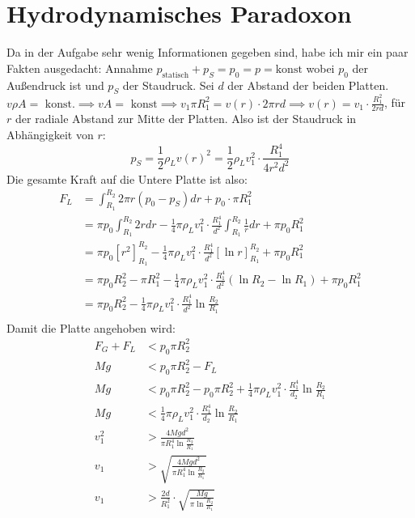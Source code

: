 \documentclass[sectionformat=aufgabe]{gadsescript}
\begin{document}
\section{Hydrodynamisches Paradoxon}
Da in der Aufgabe sehr wenig Informationen gegeben sind, habe ich mir ein paar Fakten ausgedacht: Annahme $ p_{\text{statisch}}  + p_S = p_0 = p = \text{konst} $ wobei $ p_0 $ der Außendruck ist und $ p_S $ der Staudruck. Sei $ d $ der Abstand der beiden Platten.\\
$ v\rho A = \text{ konst.} \implies vA = \text{ konst} \implies v_1  \pi R_1^2 = v(r) \cdot 2 \pi r d \implies v(r) = v_1 \cdot \frac{R_1^2}{ 2rd }  $, für $ r $ der radiale Abstand zur Mitte der Platten. Also ist der Staudruck in Abhängigkeit von $ r $:
\[
	p_S = \frac{ 1 }{ 2 } \rho_L v(r)^2 = \frac{ 1 }{ 2 } \rho_L v_1^2 \cdot \frac{ R_1^4 }{ 4r^2d^2 } 
\]
Die gesamte Kraft auf die Untere Platte ist also:
\begin{align*}
	F_L &=  \int_{R_1}^{R_2} 2 \pi  r (p_0 - p_S) dr + p_0 \cdot \pi R_1^2 \\
	    &= \pi p_0 \int_{R_1}^{R_2} 2r dr - \frac{ 1 }{ 4 } \pi \rho_L v_1^2 \cdot \frac{ R_1^4 }{ d^2 } \int_{R_1}^{R_2} \frac{ 1 }{ r } dr + \pi p_0 R_1^2 \\
	    &= \pi p_0 [r^2]_{R_1} ^{R_2} - \frac{ 1 }{ 4 } \pi \rho_L v_1^2 \cdot \frac{ R_1^4 }{ d^2 } [\ln r]_{R_1} ^{R_2}  + \pi p_0 R_1^2 \\
	    &= \pi p_0 R_2^2 - \pi R_1^2 - \frac{ 1 }{ 4 } \pi \rho_L v_1^2 \cdot \frac{ R_1^4 }{ d^2 } \left( \ln R_2 - \ln R_1 \right) + \pi p_0 R_1^2 \\
	    &= \pi p_0 R_2^2 - \frac{ 1 }{ 4 } \pi \rho_L v_1^2 \cdot \frac{ R_1^4 }{ d^2 } \ln \frac{R_2}{ R_1 } \\
\end{align*}
Damit die Platte angehoben wird:
\begin{align*}
	F_G + F_L &< p_0 \pi R_2^2 \\
	Mg &< p_0 \pi R_2^2 - F_L \\
	Mg &< p_0 \pi R_2^2 - p_0 \pi  R_2^2 + \frac{ 1 }{ 4 } \pi  \rho_L v_1^2 \cdot \frac{ R_1^4 }{ d_2 } \ln \frac{R_2}{ R_1 } \\
	Mg &< \frac{ 1 }{ 4 } \pi  \rho_L v_1^2 \cdot \frac{ R_1^4 }{ d_2 } \ln \frac{R_2}{ R_1 } \\
	v_1^2 &> \frac{ 4Mgd^2}{ \pi R_1^4 \ln \frac{ R_2 }{ R_1 }  } \\
	v_1 &> \sqrt{\frac{ 4Mgd^2}{ \pi R_1^4 \ln \frac{ R_2 }{ R_1 }  } } \\
	v_1 &> \frac{ 2d }{ R_1^2 } \cdot \sqrt{\frac{ Mg}{ \pi \ln \frac{ R_2 }{ R_1 }  } } 
\end{align*}
\end{document}
